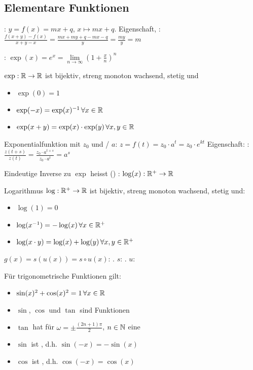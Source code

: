 \subsection{Elementare Funktionen}

\Def {}: $y = f(x) = mx + q$, $x \mapsto mx + q$. Eigenschaft, :
$\frac{f(x+y)-f(x)}{x+y-x} = \frac{mx + my + q -mx - q}{y} = \frac{my}{y} = m$

\Def {}: $\exp(x) = e^x = \lim\limits_{n\to\infty} \left(1 + \frac{x}{n}\right)^n$

\Satz $\exp: \mathbb{R} \to \mathbb{R}$ ist bijektiv, streng monoton wachsend, stetig und
\vspace{-0.6em}
\begin{itemize}
    \item $\exp(0) = 1$
    \item $\exp(-x) = \exp(x)^{-1} \, \forall x \in \mathbb{R}$
    \item $\exp(x + y) = \exp(x)\cdot\exp(y) \, \forall x,y \in \mathbb{R}$
\end{itemize}

\Def Exponentialfunktion mit  $z_0$ und / $a$: $z = f(t) = z_0 \cdot a^t = z_0 \cdot e^{kt}$
Eigenschaft: : $\frac{z(t + s)}{z(t)} = \frac{z_0 \cdot a^{t + s}}{z_0 \cdot a^t} = a^s$

\Def Eindeutige Inverse zu $\exp$ heisst () : $\log(x): \mathbb{R}^+ \to \mathbb{R}$

\Satz Logarithmus $\log: \mathbb{R}^+ \to \mathbb{R}$ ist bijektiv, streng monoton wachsend, stetig und:
\vspace{-0.6em}
\begin{itemize}
    \item $\log(1) = 0$
    \item $\log(x^{-1}) = -\log(x) \, \forall x \in \mathbb{R}^+$
    \item $\log(x \cdot y) = \log(x) + \log(y) \, \forall x,y \in \mathbb{R}^+$
\end{itemize}

\Def $g(x) = s(u(x)) = s \circ u(x)$: . $s$: . $u$: 

\Satz Für trigonometrische Funktionen gilt:
\vspace{-0.6em}
\begin{itemize}
    \item $\sin(x)^2 + \cos(x)^2 = 1 \, \forall x \in \mathbb{R}$
    \item $\sin$, $\cos$ und $\tan$ sind  Funktionen
    \item $\tan$ hat für $\omega = \pm \frac{(2n+1)\pi}{2}$, $n \in \mathbb{N}$ eine 
    \item $\sin$ ist , d.h. $\sin(-x) = -\sin(x)$
    \item $\cos$ ist , d.h. $\cos(-x) = \cos(x)$
\end{itemize}

